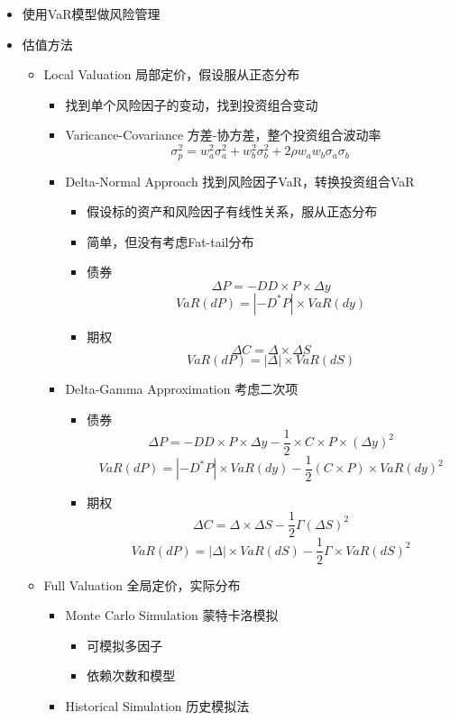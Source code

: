 \documentclass[a4paper,6pt,twoside,openany]{article}
\begin{document}
\begin{itemize}
\item 使用VaR模型做风险管理
\item 估值方法
  \begin{itemize}
  \item Local Valuation 局部定价，假设服从正态分布
    \begin{itemize}
    \item 找到单个风险因子的变动，找到投资组合变动
    \item Varicance-Covariance 方差-协方差，整个投资组合波动率
      $$\sigma_p^2 = w_a^2\sigma_a^2 + w_b^2\sigma_b^2 + 2 \rho w_aw_b\sigma_a\sigma_b  $$
    \item Delta-Normal Approach 找到风险因子VaR，转换投资组合VaR
      \begin{itemize}
      \item 假设标的资产和风险因子有线性关系，服从正态分布
      \item 简单，但没有考虑Fat-tail分布
      \item 债券
      $$\Delta P = -DD \times P \times \Delta y$$
      $$VaR(dP) = |-D^* P| \times VaR(dy)$$
    \item 期权
      $$\Delta C = \Delta \times \Delta S$$
      $$VaR(dP) = |\Delta| \times VaR(dS)$$
    \end{itemize}
  \item Delta-Gamma Approximation 考虑二次项
    \begin{itemize}
    \item 债券
      $$\Delta P = -DD \times P \times \Delta y - \frac{1}{2}\times C \times P \times (\Delta y)^2$$
      $$VaR(dP) = |-D^* P| \times VaR(dy) - \frac{1}{2}(C \times P) \times VaR(dy)^2$$
    \item 期权
      $$\Delta C = \Delta \times \Delta S - \frac{1}{2}\Gamma(\Delta S)^2$$
      $$VaR(dP) = |\Delta| \times VaR(dS) - \frac{1}{2}\Gamma \times VaR(dS)^2$$
    \end{itemize}
  \end{itemize}
\item Full Valuation 全局定价，实际分布
  \begin{itemize}
  \item Monte Carlo Simulation 蒙特卡洛模拟
    \begin{itemize}
      \item 可模拟多因子
    \item 依赖次数和模型
    \end{itemize}
  \item Historical Simulation 历史模拟法

\end{itemize}
\end{itemize}
\end{itemize}
\end{document}
